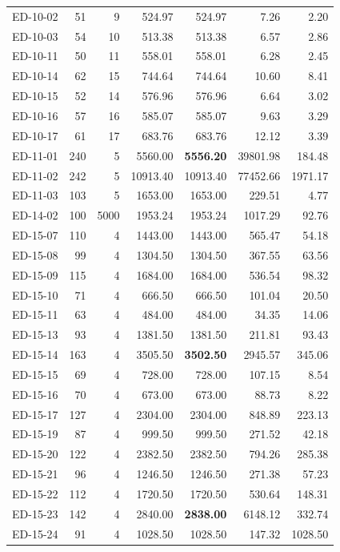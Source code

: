 \documentclass[pdflatex,basic,Numbered]{jnl}%
\theoremstyle{plain}
\theoremstyle{remark}
\theoremstyle{thmstyleone}%
\theoremstyle{thmstylethree}%
\begin{document}
\begin{longtable}[c]{l r r r r r r}
ED-10-02 & 51 & 9 & 524.97 & 524.97 & 7.26 & 2.20 \\
ED-10-03 & 54 & 10 & 513.38 & 513.38 & 6.57 & 2.86 \\
ED-10-11 & 50 & 11 & 558.01 & 558.01 & 6.28 & 2.45 \\
ED-10-14 & 62 & 15 & 744.64 & 744.64 & 10.60 & 8.41 \\
ED-10-15 & 52 & 14 & 576.96 & 576.96 & 6.64 & 3.02 \\
ED-10-16 & 57 & 16 & 585.07 & 585.07 & 9.63 & 3.29 \\
ED-10-17 & 61 & 17 & 683.76 & 683.76 & 12.12 & 3.39 \\
ED-11-01 & 240 & 5 & 5560.00 & \textbf{5556.20} & 39801.98 & 184.48 \\
ED-11-02 & 242 & 5 & 10913.40 & 10913.40 & 77452.66 & 1971.17 \\
ED-11-03 & 103 & 5 & 1653.00 & 1653.00 & 229.51 & 4.77 \\
ED-14-02 & 100 & 5000 & 1953.24 & 1953.24 & 1017.29 & 92.76 \\
ED-15-07 & 110 & 4 & 1443.00 & 1443.00 & 565.47 & 54.18 \\
ED-15-08 & 99 & 4 & 1304.50 & 1304.50 & 367.55 & 63.56 \\
ED-15-09 & 115 & 4 & 1684.00 & 1684.00 & 536.54 & 98.32 \\
ED-15-10 & 71 & 4 & 666.50 & 666.50 & 101.04 & 20.50 \\
ED-15-11 & 63 & 4 & 484.00 & 484.00 & 34.35 & 14.06 \\
ED-15-13 & 93 & 4 & 1381.50 & 1381.50 & 211.81 & 93.43 \\
ED-15-14 & 163 & 4 & 3505.50 & \textbf{3502.50} & 2945.57 & 345.06 \\
ED-15-15 & 69 & 4 & 728.00 & 728.00 & 107.15 & 8.54 \\
ED-15-16 & 70 & 4 & 673.00 & 673.00 & 88.73 & 8.22 \\
ED-15-17 & 127 & 4 & 2304.00 & 2304.00 & 848.89 & 223.13 \\
ED-15-19 & 87 & 4 & 999.50 & 999.50 & 271.52 & 42.18 \\
ED-15-20 & 122 & 4 & 2382.50 & 2382.50 & 794.26 & 285.38 \\
ED-15-21 & 96 & 4 & 1246.50 & 1246.50 & 271.38 & 57.23 \\
ED-15-22 & 112 & 4 & 1720.50 & 1720.50 & 530.64 & 148.31 \\
ED-15-23 & 142 & 4 & 2840.00 & \textbf{2838.00} & 6148.12 & 332.74 \\
ED-15-24 & 91 & 4 & 1028.50 & 1028.50 & 147.32 & 1028.50 \\

\end{longtable}
\end{document}
